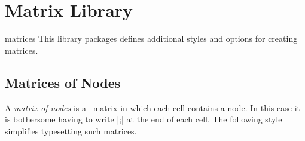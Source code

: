 %
%
%


\section{Matrix Library}

\begin{pgflibrary}{matrices}
  This library packages defines additional styles and options for
  creating matrices.
\end{pgflibrary}


\subsection{Matrices of Nodes}

A \emph{matrix of nodes} is a \tikzname\ matrix in which each cell
contains a node. In this case it is bothersome having to write
|;| at the end of each
cell. The following style simplifies typesetting such matrices.

